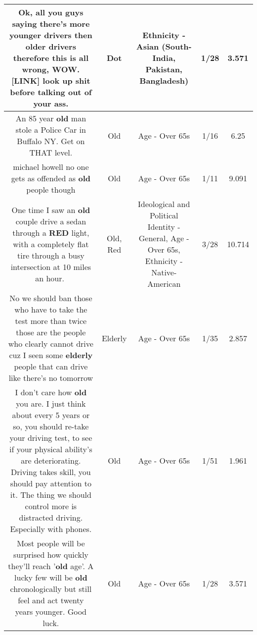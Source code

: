 \documentclass[11pt]{article}
\newlength\mylength
\begin{document}
\begin{center}
\begin{longtable}{|C{.65\mylength}|C{.30\mylength}|C{.12\mylength}|C{.12\mylength}|C{.12\mylength}|}
  \small Ok, all you guys saying there's more younger drivers then older drivers therefore this is all wrong, WOW.  [LINK]  look up shit before talking out of your ass.\normalsize   & Dot & Ethnicity - Asian (South- India, Pakistan, Bangladesh) & 1/28 & 3.571 \\  \hline
  \small An 85 year \textbf{old} man stole a Police Car in Buffalo NY. Get on THAT level.\normalsize   & Old & Age - Over 65s & 1/16 & 6.25 \\  \hline
  \small michael howell no one gets as offended as \textbf{old} people though\normalsize   & Old & Age - Over 65s & 1/11 & 9.091 \\  \hline
  \small One time I saw an \textbf{old} couple drive a sedan through a \textbf{R\textbf{ED}} light, with a completely flat tire through a busy intersection at 10 miles an hour.🤨\normalsize   & Old, Red &  Ideological and Political Identity - General, Age - Over 65s, Ethnicity - Native-American & 3/28 & 10.714 \\  \hline
  \small No we should ban those who have to take the test more than twice those are the people who clearly cannot drive cuz I seen some \textbf{elderly} people that can drive like there's no tomorrow\normalsize   & Elderly & Age - Over 65s & 1/35 & 2.857 \\  \hline
  \small I don't care how \textbf{old} you are. I just think about every 5 years or so, you should re-take your driving test, to see if your physical ability's are deteriorating. Driving takes skill, you should pay attention to it. The thing we should control more is distracted driving. Especially with phones.\normalsize   & Old & Age - Over 65s & 1/51 & 1.961 \\  \hline
  \small Most people will be surprised how quickly they'll reach '\textbf{old} age'. A lucky few will be \textbf{old} chronologically but still feel and act twenty years younger. Good luck.\normalsize   & Old & Age - Over 65s & 1/28 & 3.571 \\  \hline

\end{longtable}
\end{center}
\end{document}

